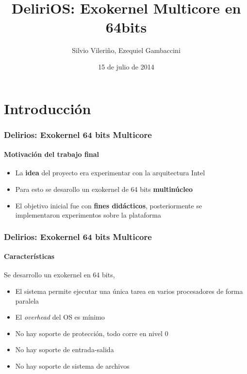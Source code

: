 \documentclass{beamer}
\title{DeliriOS: Exokernel Multicore en 64bits}
\author{Silvio Vileriño, Ezequiel Gambaccini}
\date{15 de julio de 2014}
\begin{document}
\begin{frame}
  \maketitle
\end{frame}

\section{Introducción}
  
\begin{frame}
  \frametitle{Delirios: Exokernel 64 bits Multicore}    
  \framesubtitle{Motivación del trabajo final}
  \begin{itemize}
    \setlength{\itemsep}{20pt}
    \item La \textbf{idea} del proyecto era experimentar con la arquitectura Intel
    \item Para esto se desarollo un exokernel de 64 bits \textbf{multinúcleo}
    \item El objetivo inicial fue con \textbf{fines didácticos}, posteriormente se implementaron experimentos sobre la plataforma
  \end{itemize}
\end{frame}
  
\begin{frame}
  \frametitle{Delirios: Exokernel 64 bits Multicore}
  \framesubtitle{Características}
  Se desarrollo un exokernel en 64 bits,
  \vspace{15pt}
  \begin{itemize}
    \setlength{\itemsep}{15pt}
    \item El sistema permite ejecutar una única tarea en varios procesadores de forma paralela
    \item El \emph{overhead} del OS es mínimo
    \item No hay soporte de protección, todo corre en nivel $0$
    \item No hay soporte de entrada-salida
    \item No hay soporte de sistema de archivos
  \end{itemize}
\end{frame}
\end{document}
